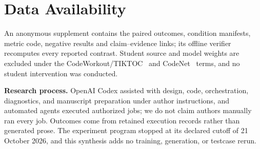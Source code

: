 \documentclass[10pt,conference]{IEEEtran}
\begin{document}
\section*{Data Availability}
An anonymous supplement contains the paired outcomes, condition manifests, metric code, negative results and claim--evidence links; its offline verifier recomputes every reported contrast. Student source and model weights are excluded under the CodeWorkout/TIKTOC~\cite{duan2024tiktoc} and CodeNet~\cite{puri2021codenet} terms, and no student intervention was conducted.


\noindent\textbf{Research process.} OpenAI Codex assisted with design, code, orchestration, diagnostics, and manuscript preparation under author instructions, and automated agents executed authorized jobs; we do not claim authors manually ran every job. Outcomes come from retained execution records rather than generated prose. The experiment program stopped at its declared cutoff of 21 October 2026, and this synthesis adds no training, generation, or testcase rerun.

\clearpage
{}


\end{document}
